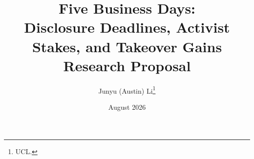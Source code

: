 \documentclass[11pt]{article}
\title{Five Business Days:\\ Disclosure Deadlines, Activist Stakes, and Takeover Gains\\[6pt]
\large Research Proposal}
\author{Junyu (Austin) Li\thanks{UCL.}}
\date{August 2026}
\begin{document}
\maketitle

\begin{abstract}

\end{abstract}








\printbibliography
\end{document}
